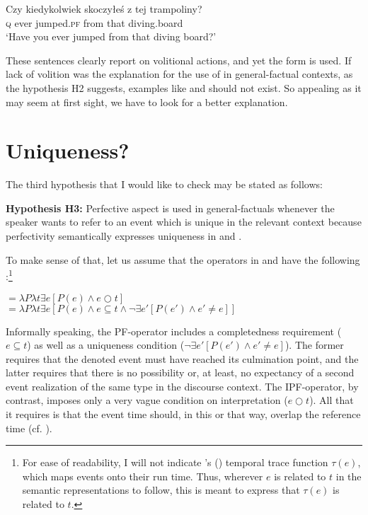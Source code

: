 \documentclass[output=paper,modfonts,newtxmath,hidelinks]{langscibook}
\begin{document}
\begin{exe}
\ex\label{13:trampolin}
\gll Czy kiedykolwiek skoczy\l{e}\'s z tej trampoliny? \\
\textsc{q} ever jumped.\textsc{pf} from that diving.board  \\
\glt `Have you ever jumped from that diving board?'
\end{exe}

\noindent These sentences clearly report on volitional actions, and yet the  form is used.
If lack of volition was the explanation for the use of  in general-factual contexts, 
as the hypothesis H2 suggests, examples like   and   should not exist.  
So appealing as it may seem at first sight, we have to look for a better explanation. 

\section{Uniqueness?}\label{13:s5} 
The third hypothesis that I would like to check may be stated as follows:

\begin{exe}
\ex\label{13:hypo3}
\textbf{Hypothesis H3:} Perfective aspect is used in general-factuals whenever the speaker wants to refer to an event which is unique in the relevant context because 
perfectivity semantically expresses uniqueness in  and . 
\end{exe}

\noindent To make sense of that, let us assume that the  operators in  and  have the following :\footnote{For ease of readability, I will not indicate \citeauthor{Krifka98}'s (\citeyear{Krifka98}) temporal trace function $\tau(e)$,
which maps events onto their run time. Thus, wherever $e$ is related to $t$ in the semantic representations to follow, this is meant to express that $\tau(e)$ is related to $t$.}

\begin{exe}
\ex\label{13:aspuniq}
${}= \lambda P \lambda t \exists e [P(e) \wedge e \bigcirc t]$\\
${}= \lambda P \lambda t \exists e[P(e) \wedge e \subseteq t \wedge \neg \exists e'[ P(e') \wedge e' \neq e]]$
\end{exe}

\noindent Informally speaking, the PF-operator includes a completedness requirement ($e \subseteq t$) as well as 
a uniqueness condition ($\neg \exists e'[ P(e') \wedge e' \neq e]$). The former requires that the denoted event must have reached 
its culmination point, and the latter requires that there is no possibility or, at least, no expectancy of a second event realization of the same type 
in the discourse context. The IPF-operator, by contrast, imposes only a very vague condition on interpretation ($e \bigcirc t$). All that it requires is that the 
event time should, in this or that way, overlap the reference time (cf. \citealt{Gronn2004}). 
\end{document}
